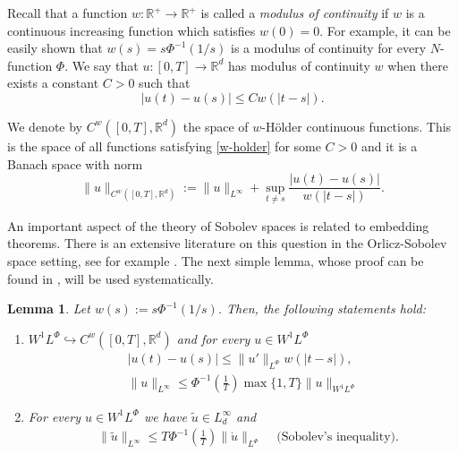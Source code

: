 \documentclass[twoside]{article}
\newtheorem{lem}[thm]{Lemma}
\theoremstyle{remark}
\newcommand{\orlnor}{\|_{L^{\Phi}}}
\newcommand{\lphi}{L^{\Phi}}
\newcommand{\wphi}{W^{1}\lphi}
\newcommand{\sobnor}{\|_{W^{1}\lphi}}
\newcommand{\rr}{\mathbb{R}}
\renewcommand{\leq}{\leqslant}
\begin{document}
 Recall that a function   $w:\mathbb{R}^+\to \mathbb{R}^+$ is called  a \emph{modulus of continuity} if $w$ is a continuous increasing function which satisfies $w(0)=0$. For example, it can be easily shown that $w(s)=s\Phi^{-1}(1/s)$ is a modulus of  continuity for every $N$-function $\Phi$.  We say that $u:[0,T]\to\rr^d$  has modulus of continuity $w$  when there exists a constant $C>0$ such that
\begin{equation}\label{w-holder}|u(t)-u(s)|\leq Cw(|t-s|).
\end{equation}


We denote by $C^w([0,T],\rr^d)$  the space of  $w$-H\"older continuous functions. This is the space of all functions satisfying \eqref{w-holder} for some $C>0$ and it is a Banach space with norm
\[\|u\|_{  C^w([0,T],\rr^d) }  :=\|u\|_{L^{\infty}}+\sup\limits_{t\neq s}\frac{|u(t)-u(s)|}{w(|t-s|)}.\]





 An important aspect of the theory of Sobolev spaces is related to embedding theorems. There is an extensive literature on this question in the  Orlicz-Sobolev space setting, see for example
 \cite{cianchi2000fully,cianchi1999some,claverooptimal,edmunds2000optimal,kerman2006optimal}.
The next simple lemma, whose proof can be found in \cite{ABGMS2015}, will be used systematically.




\begin{lem}\label{inclusion orlicz} Let  $w(s):= s\Phi^{-1}(1/s)$. Then, the following statements hold:
\begin{enumerate}
\item\label{inclusion orlicz_item1} $\wphi\hookrightarrow C^w([0,T],\rr^d) $ and for every $u\in\wphi$
\begin{align}
 &\left|u(t)-u(s) \right| \leq  \|u'\orlnor w(| t-s|),&\label{in-sob-cont}
\\
& \|u\|_{L^{\infty}} \leq\Phi^{-1}\left(\frac{1}{T}\right)\max\{1,T\}\|u\sobnor&\label{sobolev}
\end{align}
\item For every $u\in\wphi$ we have $\widetilde{u}\in L^{\infty}_d$ and
\begin{align}
& \|\widetilde{u}\|_{L^{\infty}} \leq T\Phi^{-1}\left(\frac{1}{T}\right)\|\dot{u}\orlnor&\text{  (Sobolev's inequality).}\label{wirtinger}
\end{align}




\end{enumerate}
\end{lem}
\end{document}

